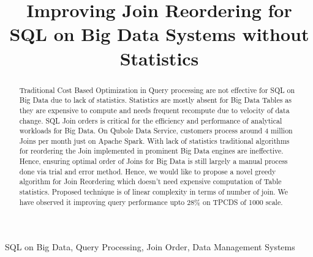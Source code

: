 \documentclass[conference]{IEEEtran}
\begin{document}
\title{Improving Join Reordering for SQL on Big Data Systems without Statistics\\
}

\author{
\and
{}
}

\maketitle

\begin{abstract}
Traditional Cost Based Optimization in Query processing are not effective for SQL on Big Data due to lack of statistics. Statistics are mostly absent for Big Data Tables as they are expensive to compute and needs frequent recompute due to velocity of data change.
SQL Join orders is critical for the efficiency and performance of analytical workloads for Big Data. On Qubole Data Service, customers process around 4 million Joins per month just on Apache Spark. With lack of statistics traditional algorithms for reordering the Join implemented in prominent Big Data engines are ineffective. Hence, ensuring optimal order of Joins for Big Data  is still largely a manual process done via trial and error method. Hence, we would like to propose a novel greedy algorithm for Join Reordering which doesn't need expensive computation of Table statistics. Proposed technique is of linear complexity in terms of number of join. We have observed it improving query performance upto 28\% on TPCDS of 1000 scale.
\end{abstract}

\begin{IEEEkeywords}
SQL on Big Data, Query Processing, Join Order, Data Management Systems
\end{IEEEkeywords}
\end{document}
